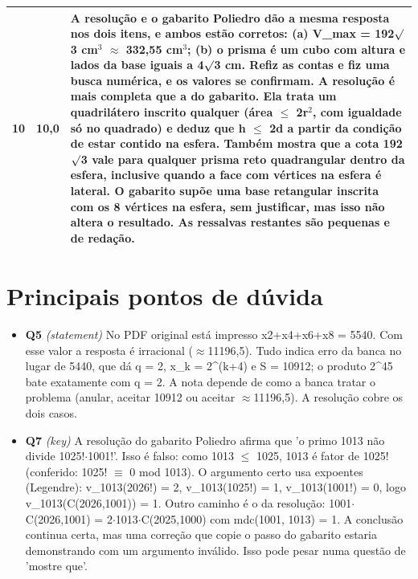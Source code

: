 \documentclass{article}%
\begin{document}
\begin{longtable}{@{}c c p{}@{}}
10 & 10,0 & A resolução e o gabarito Poliedro dão a mesma resposta nos dois itens, e ambos estão corretos: (a) V\_max = 192$\surd$3 cm$^3$ $\approx$ 332,55 cm$^3$; (b) o prisma é um cubo com altura e lados da base iguais a 4$\surd$3 cm. Refiz as contas e fiz uma busca numérica, e os valores se confirmam. A resolução é mais completa que a do gabarito. Ela trata um quadrilátero inscrito qualquer (área $\leq$ 2r$^2$, com igualdade só no quadrado) e deduz que h $\leq$ 2d a partir da condição de estar contido na esfera. Também mostra que a cota 192$\surd$3 vale para qualquer prisma reto quadrangular dentro da esfera, inclusive quando a face com vértices na esfera é lateral. O gabarito supõe uma base retangular inscrita com os 8 vértices na esfera, sem justificar, mas isso não altera o resultado. As ressalvas restantes são pequenas e de redação. \\
\bottomrule\end{longtable}%
\section*{Principais pontos de dúvida}%
\begin{itemize}%
\item%
\textbf{Q5} \textit{(statement)} No PDF original está impresso x2+x4+x6+x8 = 5540. Com esse valor a resposta é irracional ($\approx$11196,5). Tudo indica erro da banca no lugar de 5440, que dá q = 2, x\_k = 2\^{}(k+4) e S = 10912; o produto 2\^{}45 bate exatamente com q = 2. A nota depende de como a banca tratar o problema (anular, aceitar 10912 ou aceitar $\approx$11196,5). A resolução cobre os dois casos.%
\item%
\textbf{Q7} \textit{(key)} A resolução do gabarito Poliedro afirma que 'o primo 1013 não divide 1025!$\cdot$1001!'. Isso é falso: como 1013 $\leq$ 1025, 1013 é fator de 1025! (conferido: 1025! $\equiv$ 0 mod 1013). O argumento certo usa expoentes (Legendre): v\_1013(2026!) = 2, v\_1013(1025!) = 1, v\_1013(1001!) = 0, logo v\_1013(C(2026,1001)) = 1. Outro caminho é o da resolução: 1001$\cdot$C(2026,1001) = 2$\cdot$1013$\cdot$C(2025,1000) com mdc(1001, 1013) = 1. A conclusão continua certa, mas uma correção que copie o passo do gabarito estaria demonstrando com um argumento inválido. Isso pode pesar numa questão de 'mostre que'.%
\end{itemize}%
\end{document}
